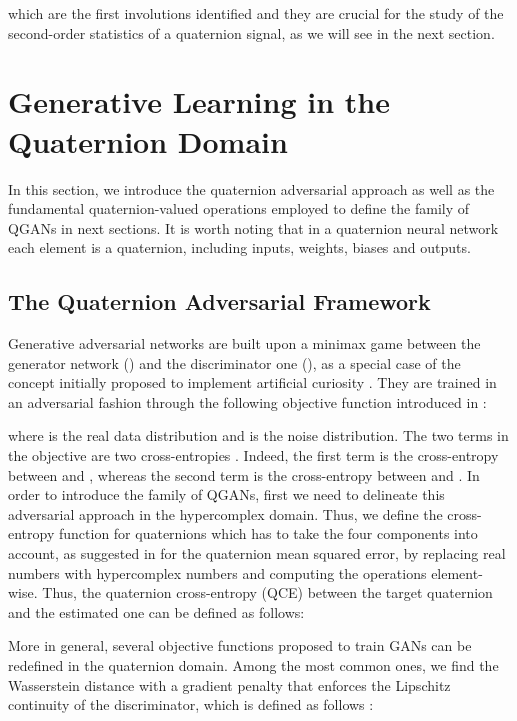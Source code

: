 \documentclass[graybox]{svmult}
\begin{document}
\noindent which are the first involutions identified \cite{Chernov1995} and they are crucial for the study of the second-order statistics of a quaternion signal, as we will see in the next section.

\section{Generative Learning in the Quaternion Domain}
\label{sec:qlearn}
In this section, we introduce the quaternion adversarial approach as well as the fundamental quaternion-valued operations employed to define the family of QGANs in next sections. It is worth noting that in a quaternion neural network each element is a quaternion, including inputs, weights, biases and outputs.

\subsection{The Quaternion Adversarial Framework}

\noindent Generative adversarial networks are built upon a minimax game between the generator network () and the discriminator one (), as a special case of the concept initially proposed to implement artificial curiosity \cite{SchmidhuberMIT1991, SchmidhuberNEUNET2020}. They are trained in an adversarial fashion through the following objective function introduced in \cite{GoodfellowNIPS2014}:



\noindent where  is the real data distribution and  is the noise distribution. The two terms in the objective are two cross-entropies \cite{Gui2020ARO}. Indeed, the first term is the cross-entropy between  and , whereas the second term is the cross-entropy between  and . 
In order to introduce the family of QGANs, first we need to delineate this adversarial approach in the hypercomplex domain. Thus, we define the cross-entropy function for quaternions which has to take the four components into account, as suggested in \cite{ParcolletAIR2019} for the quaternion mean squared error, by replacing real numbers with hypercomplex numbers and computing the operations element-wise. Thus, the quaternion cross-entropy (QCE) between the target quaternion  and the estimated one  can be defined as follows:



More in general, several objective functions proposed to train GANs can be redefined in the quaternion domain.
Among the most common ones, we find the Wasserstein distance with a gradient penalty that enforces the Lipschitz continuity of the discriminator, which is defined as follows \cite{Arjovsky2017WassersteinG, GulrajaniNIPS2017}: 
\end{document}
